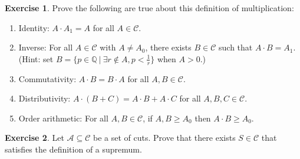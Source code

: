 \documentclass{article}
\theoremstyle{definition}
\newtheorem{exercise}{Exercise}
\newcommand{\Q}{\mathbb{Q}}
\begin{document}
\begin{exercise}Prove the following are true about this definition of multiplication:
\begin{enumerate}
\item Identity: $A\cdot A_1 = A$ for all $A\in \mathcal{C}$.
\item Inverse: For all $A\in \mathcal{C}$ with $A\neq A_0$, there exists $B\in \mathcal{C}$ such that $A\cdot B=A_1$. (Hint: set $B=\{p\in \Q\ | \ \exists r\notin A, p<\frac {1}{r}\}$ when $A>0$.)
\item Commutativity: $A\cdot B=B\cdot A$ for all $A, B\in \mathcal{C}$.
\item Distributivity: $A\cdot(B+C) = A\cdot B+A\cdot C$ for all $A, B, C\in \mathcal{C}$.
\item Order arithmetic: For all $A, B\in \mathcal{C}$, if $A, B\geq A_0$ then $A\cdot B\geq A_0$.
\end{enumerate}
\end{exercise}

\begin{exercise}
Let $\mathcal{A}\subseteq \mathcal{C}$ be a set of cuts. Prove that there exists $S\in \mathcal{C}$ that satisfies the definition of a supremum.
\end{exercise}
\end{document}
